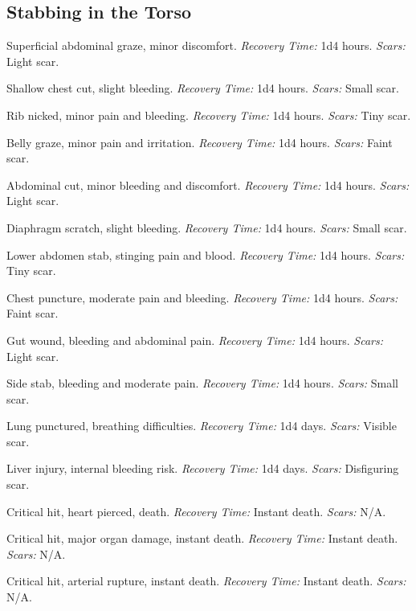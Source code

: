 \documentclass[12pt]{book}
\begin{document}
\subsection{Stabbing in the Torso}

\begin{description}[labelwidth=1.5em, leftmargin=*, itemsep=0.4em]
    \item[1 -] Superficial abdominal graze, minor discomfort. \textit{Recovery Time:} 1d4 hours. \textit{Scars:} Light scar.
    \item[2 -] Shallow chest cut, slight bleeding. \textit{Recovery Time:} 1d4 hours. \textit{Scars:} Small scar.
    \item[3 -] Rib nicked, minor pain and bleeding. \textit{Recovery Time:} 1d4 hours. \textit{Scars:} Tiny scar.
    \item[4 -] Belly graze, minor pain and irritation. \textit{Recovery Time:} 1d4 hours. \textit{Scars:} Faint scar.
    \item[5 -] Abdominal cut, minor bleeding and discomfort. \textit{Recovery Time:} 1d4 hours. \textit{Scars:} Light scar.
    \item[6 -] Diaphragm scratch, slight bleeding. \textit{Recovery Time:} 1d4 hours. \textit{Scars:} Small scar.
    \item[7 -] Lower abdomen stab, stinging pain and blood. \textit{Recovery Time:} 1d4 hours. \textit{Scars:} Tiny scar.
    \item[8 -] Chest puncture, moderate pain and bleeding. \textit{Recovery Time:} 1d4 hours. \textit{Scars:} Faint scar.
    \item[9 -] Gut wound, bleeding and abdominal pain. \textit{Recovery Time:} 1d4 hours. \textit{Scars:} Light scar.
    \item[10 -] Side stab, bleeding and moderate pain. \textit{Recovery Time:} 1d4 hours. \textit{Scars:} Small scar.
    \item[11 -] Lung punctured, breathing difficulties. \textit{Recovery Time:} 1d4 days. \textit{Scars:} Visible scar.
    \item[12 -] Liver injury, internal bleeding risk. \textit{Recovery Time:} 1d4 days. \textit{Scars:} Disfiguring scar.
    \item[13 -] Critical hit, heart pierced, death. \textit{Recovery Time:} Instant death. \textit{Scars:} N/A.
    \item[14 -] Critical hit, major organ damage, instant death. \textit{Recovery Time:} Instant death. \textit{Scars:} N/A.
    \item[15 -] Critical hit, arterial rupture, instant death. \textit{Recovery Time:} Instant death. \textit{Scars:} N/A.

\end{description}
\end{document}
